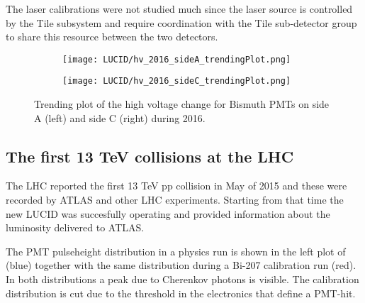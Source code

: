 The laser calibrations were not studied much since the laser source is controlled by the Tile subsystem and require 
coordination with the Tile sub-detector group to share this resource between the two detectors.

\begin{figure}
\centering
\begin{subfigure}{.5\textwidth}
  \centering
  \texttt{[image: LUCID/hv\_2016\_sideA\_trendingPlot.png]}
  \label{fig:sub3}
\end{subfigure}%
\begin{subfigure}{.5\textwidth}
  \centering
  \texttt{[image: LUCID/hv\_2016\_sideC\_trendingPlot.png]}
  \label{fig:sub4}
\end{subfigure}
\caption{Trending plot of the high voltage change for Bismuth PMTs on side A (left) and side C (right) during 2016.}
\label{fig:hv_trending_plot_2016}
\end{figure}





\subsection{The first 13 TeV collisions at the LHC}
\label{sec:physics}

The LHC reported the first 13 TeV pp collision in May of 2015 and these were recorded by ATLAS and other LHC experiments. 
Starting from that time the new LUCID was succesfully operating and provided information about the 
luminosity delivered to ATLAS. 

The PMT pulseheight distribution in a physics run is shown in the left plot of  (blue) 
together with the same distribution 
during a Bi-207 calibration run (red). In both distributions a peak due to Cherenkov photons is visible. The 
calibration distribution is cut due to the threshold in the electronics that define a PMT-hit.

